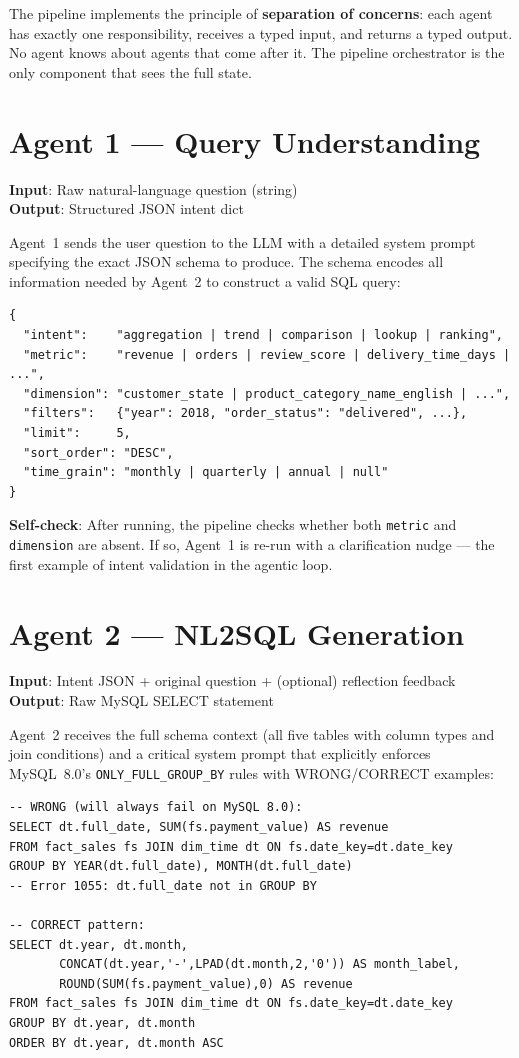 \documentclass[12pt,a4paper]{report}
\begin{document}
The pipeline implements the principle of \textbf{separation of concerns}: each agent has
exactly one responsibility, receives a typed input, and returns a typed output. No agent knows
about agents that come after it. The pipeline orchestrator is the only component that sees the
full state.

\section{Agent 1 — Query Understanding}

\textbf{Input}: Raw natural-language question (string)\\
\textbf{Output}: Structured JSON intent dict

Agent~1 sends the user question to the LLM with a detailed system prompt specifying the exact
JSON schema to produce. The schema encodes all information needed by Agent~2 to construct a
valid SQL query:

\begin{lstlisting}[caption={Intent JSON schema}]
{
  "intent":    "aggregation | trend | comparison | lookup | ranking",
  "metric":    "revenue | orders | review_score | delivery_time_days | ...",
  "dimension": "customer_state | product_category_name_english | ...",
  "filters":   {"year": 2018, "order_status": "delivered", ...},
  "limit":     5,
  "sort_order": "DESC",
  "time_grain": "monthly | quarterly | annual | null"
}
\end{lstlisting}

\textbf{Self-check}: After running, the pipeline checks whether both \texttt{metric} and
\texttt{dimension} are absent. If so, Agent~1 is re-run with a clarification nudge — the
first example of intent validation in the agentic loop.

\section{Agent 2 — NL2SQL Generation}

\textbf{Input}: Intent JSON + original question + (optional) reflection feedback\\
\textbf{Output}: Raw MySQL SELECT statement

Agent~2 receives the full schema context (all five tables with column types and join conditions)
and a critical system prompt that explicitly enforces MySQL~8.0's \texttt{ONLY\_FULL\_GROUP\_BY}
rules with WRONG/CORRECT examples:

\begin{lstlisting}[style=sqlcode, caption={ONLY\_FULL\_GROUP\_BY enforcement in prompt}]
-- WRONG (will always fail on MySQL 8.0):
SELECT dt.full_date, SUM(fs.payment_value) AS revenue
FROM fact_sales fs JOIN dim_time dt ON fs.date_key=dt.date_key
GROUP BY YEAR(dt.full_date), MONTH(dt.full_date)
-- Error 1055: dt.full_date not in GROUP BY

-- CORRECT pattern:
SELECT dt.year, dt.month,
       CONCAT(dt.year,'-',LPAD(dt.month,2,'0')) AS month_label,
       ROUND(SUM(fs.payment_value),0) AS revenue
FROM fact_sales fs JOIN dim_time dt ON fs.date_key=dt.date_key
GROUP BY dt.year, dt.month
ORDER BY dt.year, dt.month ASC
\end{lstlisting}
\end{document}
